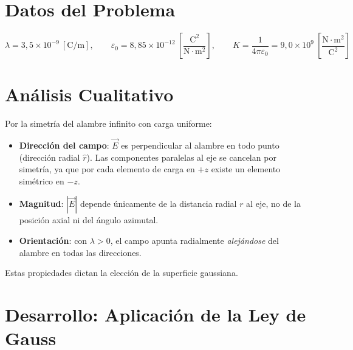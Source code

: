\documentclass[12pt,letterpaper]{article}
\begin{document}
\begin{center}
\end{center}

\section*{Datos del Problema}

\[
    \lambda = 3{,}5 \times 10^{-9}\ [\text{C/m}],
    \qquad
    \varepsilon_0 = 8{,}85 \times 10^{-12}
    \ \left[\frac{\text{C}^2}{\text{N}\cdot\text{m}^2}\right],
    \qquad
    K = \frac{1}{4\pi\varepsilon_0} = 9{,}0 \times 10^9
    \ \left[\frac{\text{N}\cdot\text{m}^2}{\text{C}^2}\right]
\]

\section*{An\'alisis Cualitativo}

Por la simetr\'ia del alambre infinito con carga uniforme:
\begin{itemize}
    \item \textbf{Direcci\'on del campo}: $\vec{E}$ es perpendicular al alambre en todo
          punto (direcci\'on radial $\hat{r}$). Las componentes paralelas al eje se
          cancelan por simetr\'ia, ya que por cada elemento de carga en $+z$ existe
          un elemento sim\'etrico en $-z$.
    \item \textbf{Magnitud}: $|\vec{E}|$ depende \'unicamente de la distancia radial $r$
          al eje, no de la posici\'on axial ni del \'angulo azimutal.
    \item \textbf{Orientaci\'on}: con $\lambda > 0$, el campo apunta radialmente
          \emph{alejándose} del alambre en todas las direcciones.
\end{itemize}
Estas propiedades dictan la elecci\'on de la superficie gaussiana.

\section*{Desarrollo: Aplicaci\'on de la Ley de Gauss}
\end{document}
